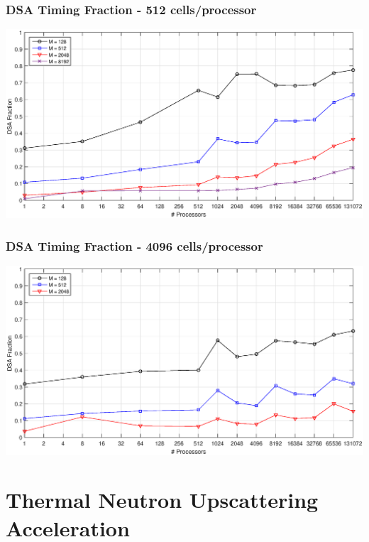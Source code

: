 \documentclass[compress,10pt]{beamer}
\begin{document}
\begin{frame}[t]
{}
{
\frametitle{DSA Timing Fraction - 512 cells/processor}
\centering
\includegraphics[width=\textwidth]{images/C512.eps}
}
{
\frametitle{DSA Timing Fraction - 4096 cells/processor}
\centering
\includegraphics[width=\textwidth]{images/C4096.eps}
}
\end{frame}
\typeout{***********************************************************************************}
\section[Upscattering Acceleration]{Thermal Neutron Upscattering Acceleration}
\end{document}
